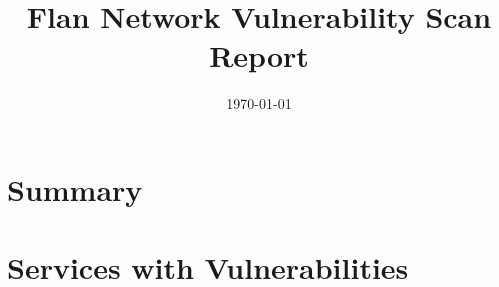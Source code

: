 \documentclass{article}
\title{Flan Network Vulnerability Scan Report\\}
\date{\today}
\begin{document}
\maketitle

\section*{Summary}


\section*{Services with Vulnerabilities}
\end{document}
